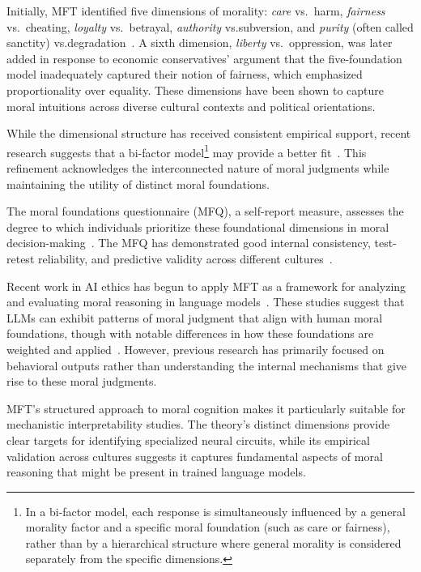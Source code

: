 Initially, MFT identified five dimensions of morality: \emph{care} vs.~harm, \emph{fairness} vs.~cheating, \emph{loyalty} vs.~betrayal, \emph{authority} vs.subversion, and \emph{purity} (often called sanctity) vs.degradation~\cite{Graham2011Mapping}. A sixth dimension, \emph{liberty} vs.~oppression, was later added in response to economic conservatives' argument that the five-foundation model inadequately captured their notion of fairness, which emphasized proportionality over equality\cite{Haidt2012}. These dimensions have been shown to capture moral intuitions across diverse cultural contexts and political orientations\cite{Graham2013}.

While the dimensional structure has received consistent empirical support, recent research suggests that a bi-factor model\footnote{In a bi-factor model, each response is simultaneously influenced by a general morality factor and a specific moral foundation (such as care or fairness), rather than by a hierarchical structure where general morality is considered separately from the specific dimensions.} may provide a better fit~\cite{Wormley2023Measuring}. This refinement acknowledges the interconnected nature of moral judgments while maintaining the utility of distinct moral foundations.

The moral foundations questionnaire (MFQ), a self-report measure, assesses the degree to which individuals prioritize these foundational dimensions in moral decision-making~\cite{Zhang2020}. The MFQ has demonstrated good internal consistency, test-retest reliability, and predictive validity across different cultures~\cite{Metayer2014,Davies2014Confirmatory,Du2019Validation}.

Recent work in AI ethics has begun to apply MFT as a framework for analyzing and evaluating moral reasoning in language models~\cite{Hendrycks2021}. These studies suggest that LLMs can exhibit patterns of moral judgment that align with human moral foundations, though with notable differences in how these foundations are weighted and applied~\cite{Askell2021}. However, previous research has primarily focused on behavioral outputs rather than understanding the internal mechanisms that give rise to these moral judgments.

MFT's structured approach to moral cognition makes it particularly suitable for mechanistic interpretability studies. The theory's distinct dimensions provide clear targets for identifying specialized neural circuits, while its empirical validation across cultures suggests it captures fundamental aspects of moral reasoning that might be present in trained language models.

